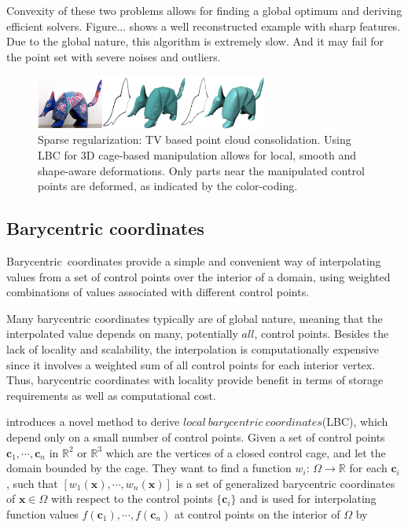 Convexity of these two problems allows for finding a global optimum and deriving efficient solvers.
Figure... shows a well reconstructed example with sharp features.
Due to the global nature, this algorithm is extremely slow.
And it may fail for the point set with severe noises and outliers.

\begin{figure}[ht]
  \centering
  \includegraphics[width=3in]{images/TV consolidation}
  \caption{Sparse regularization: TV based point cloud consolidation\cite{lipman2007parameterization}. Using LBC for 3D cage-based manipulation allows for local, smooth and shape-aware deformations. Only parts near the manipulated control points are deformed, as indicated by the color-coding.}
  \label{fig:TV consolidation}
\end{figure}


\subsection{Barycentric coordinates}
\label{subsec:Barycentric coordinates}

Barycentric~coordinates provide a simple and convenient way of interpolating values from a set of control points over the interior of a domain, using weighted combinations of values associated with different control points.

Many barycentric coordinates typically are of global nature, meaning that the interpolated value depends on many, potentially $all$, control points. Besides the lack of locality and scalability, the interpolation is computationally expensive since it involves a weighted sum of all control points for each interior vertex.
Thus, barycentric coordinates with locality provide benefit in terms of storage requirements as well as computational cost.

\cite{zhang2014local} introduces a novel method to derive $local~barycentric~coordinates$(LBC), which depend only on a small number of control points.
Given a set of control points $\mathbf{c}_1, \cdots, \mathbf{c}_n$ in $\mathbb{R}^2$ or  $\mathbb{R}^3$ which are the vertices of a closed control cage, and let the domain bounded by the cage.
They want to find a function $w_{i}$: $\Omega\rightarrow\mathbb{R}$ for each $\mathbf{c}_{i}$, such that $[w_1(\mathbf{x}), \cdots, w_n(\mathbf{x})]$ is a set of generalized barycentric coordinates of $\mathbf{x}\in\Omega$ with respect to the control points $\{\mathbf{c}_{i}\}$ and is used for interpolating function values $f(\mathbf{c}_1), \cdots, f(\mathbf{c}_n)$ at control points on the interior of $\Omega$ by

